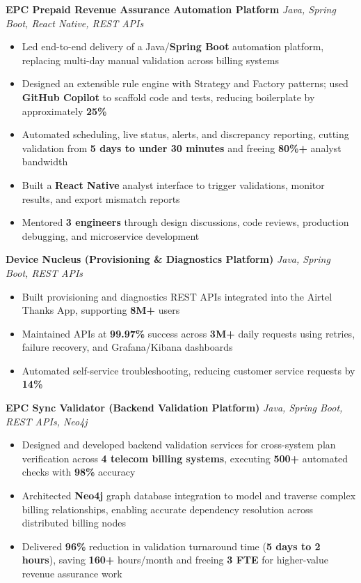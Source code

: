 \documentclass[letterpaper,11pt]{article}
\newcommand{\resumeItem}[1]{
  \item\small{{#1 \vspace{-2pt}}}
}
\newcommand{\resumeItemListStart}{\begin{itemize}}
\newcommand{\resumeItemListEnd}{\end{itemize}\vspace{-5pt}}
\begin{document}
      \vspace{4pt}
      \textbf{\small EPC Prepaid Revenue Assurance Automation Platform} \hfill \textit{\small Java, Spring Boot, React Native, REST APIs} \\
      \vspace{-2pt}
      \resumeItemListStart
        \resumeItem{Led end-to-end delivery of a Java/\textbf{Spring Boot} automation platform, replacing multi-day manual validation across billing systems}
        \resumeItem{Designed an extensible rule engine with Strategy and Factory patterns; used \textbf{GitHub Copilot} to scaffold code and tests, reducing boilerplate by approximately \textbf{25\%}}
        \resumeItem{Automated scheduling, live status, alerts, and discrepancy reporting, cutting validation from \textbf{5 days to under 30 minutes} and freeing \textbf{80\%+} analyst bandwidth}
        \resumeItem{Built a \textbf{React Native} analyst interface to trigger validations, monitor results, and export mismatch reports}
        \resumeItem{Mentored \textbf{3 engineers} through design discussions, code reviews, production debugging, and microservice development}
      \resumeItemListEnd

      \vspace{4pt}
      \textbf{\small Device Nucleus (Provisioning \& Diagnostics Platform)} \hfill \textit{\small Java, Spring Boot, REST APIs} \\
      \vspace{-2pt}
      \resumeItemListStart
        \resumeItem{Built provisioning and diagnostics REST APIs integrated into the Airtel Thanks App, supporting \textbf{8M+} users}
        \resumeItem{Maintained APIs at \textbf{99.97\%} success across \textbf{3M+} daily requests using retries, failure recovery, and Grafana/Kibana dashboards}
        \resumeItem{Automated self-service troubleshooting, reducing customer service requests by \textbf{14\%}}
      \resumeItemListEnd

      \vspace{4pt}
      \textbf{\small EPC Sync Validator (Backend Validation Platform)} \hfill \textit{\small Java, Spring Boot, REST APIs, Neo4j} \\
      \vspace{-2pt}
      \resumeItemListStart
        \resumeItem{Designed and developed backend validation services for cross-system plan verification across \textbf{4 telecom billing systems}, executing \textbf{500+} automated checks with \textbf{98\%} accuracy}
        \resumeItem{Architected \textbf{Neo4j} graph database integration to model and traverse complex billing relationships, enabling accurate dependency resolution across distributed billing nodes}
        \resumeItem{Delivered \textbf{96\%} reduction in validation turnaround time (\textbf{5 days to 2 hours}), saving \textbf{160+} hours/month and freeing \textbf{3 FTE} for higher-value revenue assurance work}
      \resumeItemListEnd
\end{document}

